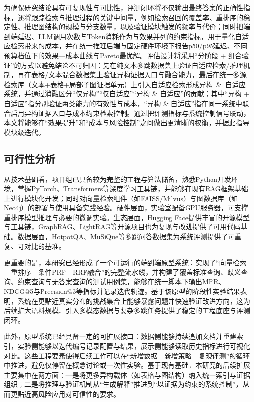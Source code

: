 为确保研究结论具有可复现性与可比性，评测闭环将不仅输出最终答案的正确性指标，还将跟踪检索与推理过程的关键中间量，例如检索召回的覆盖率、重排序的稳定性、推理图结构的规模与分支数量，以及验证模块触发的频率与代价；同时把端到端延迟、LLM调用次数与Token消耗作为与效果并列的约束指标，用于量化自适应检索带来的成本，并在统一推理后端与固定硬件环境下报告p50/p95延迟、不同预算档位下的效果—成本曲线与Pareto最优解。评估设计将采用“分阶段 + 组合验证”的方式以避免结论不可归因：先在纯文本多跳数据集上验证自适应检索/推理机制，再在表格/文本混合数据集上验证异构证据入口与融合能力，最后在统一多源检索库（文本+表格+局部子图证据单元）上引入自适应检索形成\mbox{异构 \& 自适应}系统，并通过消融区分“仅异构”“仅自适应”“异构 \& 自适应”的贡献；其中“异构 + 自适应”指分别验证两类能力的有效性与成本，“异构 \& 自适应”指在同一系统中联合启用异构证据入口与成本约束检索控制。通过把评测指标与系统控制信号联动，本文将能够在“效果提升”和“成本与风险控制”之间做出更清晰的权衡，并据此指导模块级迭代。

\subsection{可行性分析}
从技术基础看，项目组已具备较为完整的工程与算法储备，熟悉Python开发环境，掌握PyTorch\cite{pytorch}、Transformers\cite{huggingface}等深度学习工具链，并能够在现有RAG框架基础上进行模块化开发；同时对向量检索组件（如FAISS\cite{ref32}/Milvus\cite{milvus}）与图数据库（如Neo4j\cite{graphdatabases}）的部署与使用具备实践经验。硬件层面，实验室配备GPU服务器，可支撑重排序模型推理与必要的微调实验。生态层面，Hugging Face提供丰富的开源模型与工具链，GraphRAG、LightRAG等开源项目也为复现与改进提供了可用代码基础。数据层面，HotpotQA、MuSiQue等多跳问答数据集为系统评测提供了可重复、可对比的基准。

更重要的是，本研究已经形成了一个可运行的端到端原型系统：实现了“向量检索—重排序—条件PRF—RRF融合”的完整流水线，并构建了覆盖标准查询、歧义查询、约束查询与无答案查询的测试用例集，能够在统一脚本下输出MRR、NDCG@5与Precision@3等指标\cite{manning_ir, ndcg}并记录迭代轨迹。基于该原型的阶段性实验结果表明，系统在更贴近真实分布的挑战集合上能够暴露问题并快速验证改进方向，这为后续扩大语料规模、引入多模态数据与复杂多跳任务提供了稳定的工程底座与评测闭环。

此外，原型系统已经具备一定的可扩展接口：数据侧能够持续追加文档并重建索引，实验侧能够以迭代编号记录配置与结果，展示侧能够读取历史指标进行可视化对比。这些工程要素使得后续工作可以在“新增数据—新增策略—复现评测”的循环中推进，避免仅停留在概念讨论或一次性实验。基于现有基础，本研究的后续扩展主要集中在两方面：一是将更多异构载体（如表格与图结构）纳入统一索引与证据组织；二是将推理与验证机制从“生成解释”推进到“以证据为约束的系统控制”，从而更贴近高风险应用对可信性的要求。
